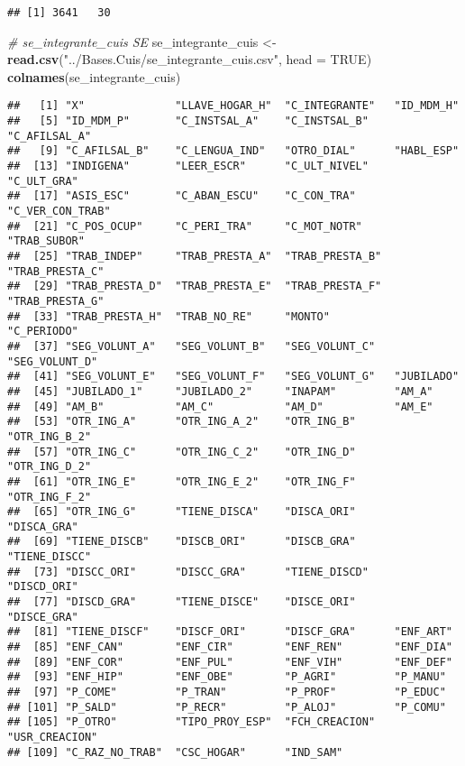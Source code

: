 \documentclass[11pt,]{article}
\newenvironment{Shaded}{\begin{snugshade}}{\end{snugshade}}
\newcommand{\KeywordTok}[1]{\textcolor[rgb]{0.13,0.29,0.53}{\textbf{#1}}}
\newcommand{\DataTypeTok}[1]{\textcolor[rgb]{0.13,0.29,0.53}{#1}}
\newcommand{\StringTok}[1]{\textcolor[rgb]{0.31,0.60,0.02}{#1}}
\newcommand{\CommentTok}[1]{\textcolor[rgb]{0.56,0.35,0.01}{\textit{#1}}}
\newcommand{\OtherTok}[1]{\textcolor[rgb]{0.56,0.35,0.01}{#1}}
\newcommand{\NormalTok}[1]{#1}
\begin{document}
\begin{verbatim}
## [1] 3641   30
\end{verbatim}

\begin{Shaded}
\begin{Highlighting}[]
\CommentTok{# se_integrante_cuis SE}
\NormalTok{se_integrante_cuis <-}\StringTok{ }\KeywordTok{read.csv}\NormalTok{(}\StringTok{"../Bases.Cuis/se_integrante_cuis.csv"}\NormalTok{, }\DataTypeTok{head =} \OtherTok{TRUE}\NormalTok{)}
\KeywordTok{colnames}\NormalTok{(se_integrante_cuis)}
\end{Highlighting}
\end{Shaded}

\begin{verbatim}
##   [1] "X"              "LLAVE_HOGAR_H"  "C_INTEGRANTE"   "ID_MDM_H"      
##   [5] "ID_MDM_P"       "C_INSTSAL_A"    "C_INSTSAL_B"    "C_AFILSAL_A"   
##   [9] "C_AFILSAL_B"    "C_LENGUA_IND"   "OTRO_DIAL"      "HABL_ESP"      
##  [13] "INDIGENA"       "LEER_ESCR"      "C_ULT_NIVEL"    "C_ULT_GRA"     
##  [17] "ASIS_ESC"       "C_ABAN_ESCU"    "C_CON_TRA"      "C_VER_CON_TRAB"
##  [21] "C_POS_OCUP"     "C_PERI_TRA"     "C_MOT_NOTR"     "TRAB_SUBOR"    
##  [25] "TRAB_INDEP"     "TRAB_PRESTA_A"  "TRAB_PRESTA_B"  "TRAB_PRESTA_C" 
##  [29] "TRAB_PRESTA_D"  "TRAB_PRESTA_E"  "TRAB_PRESTA_F"  "TRAB_PRESTA_G" 
##  [33] "TRAB_PRESTA_H"  "TRAB_NO_RE"     "MONTO"          "C_PERIODO"     
##  [37] "SEG_VOLUNT_A"   "SEG_VOLUNT_B"   "SEG_VOLUNT_C"   "SEG_VOLUNT_D"  
##  [41] "SEG_VOLUNT_E"   "SEG_VOLUNT_F"   "SEG_VOLUNT_G"   "JUBILADO"      
##  [45] "JUBILADO_1"     "JUBILADO_2"     "INAPAM"         "AM_A"          
##  [49] "AM_B"           "AM_C"           "AM_D"           "AM_E"          
##  [53] "OTR_ING_A"      "OTR_ING_A_2"    "OTR_ING_B"      "OTR_ING_B_2"   
##  [57] "OTR_ING_C"      "OTR_ING_C_2"    "OTR_ING_D"      "OTR_ING_D_2"   
##  [61] "OTR_ING_E"      "OTR_ING_E_2"    "OTR_ING_F"      "OTR_ING_F_2"   
##  [65] "OTR_ING_G"      "TIENE_DISCA"    "DISCA_ORI"      "DISCA_GRA"     
##  [69] "TIENE_DISCB"    "DISCB_ORI"      "DISCB_GRA"      "TIENE_DISCC"   
##  [73] "DISCC_ORI"      "DISCC_GRA"      "TIENE_DISCD"    "DISCD_ORI"     
##  [77] "DISCD_GRA"      "TIENE_DISCE"    "DISCE_ORI"      "DISCE_GRA"     
##  [81] "TIENE_DISCF"    "DISCF_ORI"      "DISCF_GRA"      "ENF_ART"       
##  [85] "ENF_CAN"        "ENF_CIR"        "ENF_REN"        "ENF_DIA"       
##  [89] "ENF_COR"        "ENF_PUL"        "ENF_VIH"        "ENF_DEF"       
##  [93] "ENF_HIP"        "ENF_OBE"        "P_AGRI"         "P_MANU"        
##  [97] "P_COME"         "P_TRAN"         "P_PROF"         "P_EDUC"        
## [101] "P_SALD"         "P_RECR"         "P_ALOJ"         "P_COMU"        
## [105] "P_OTRO"         "TIPO_PROY_ESP"  "FCH_CREACION"   "USR_CREACION"  
## [109] "C_RAZ_NO_TRAB"  "CSC_HOGAR"      "IND_SAM"
\end{verbatim}
\end{document}
